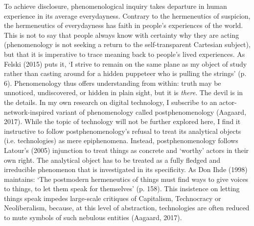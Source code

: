 \begin{adjmulticols}{2}{0mm}{0mm}
To achieve disclosure, phenomenological inquiry takes departure in human experience in its average everydayness. Contrary to the hermeneutics of suspicion, the hermeneutics of everydayness has faith in people’s experiences of the world. This is not to say that people always know with certainty why they are acting (phenomenology is not seeking a return to the self-transparent Cartesian subject), but that it is imperative to trace meaning back to people’s lived experiences. As Felski (2015) puts it, ‘I strive to remain on the same plane as my object of study rather than casting around for a hidden puppeteer who is pulling the strings’ (p. 6). Phenomenology thus offers understanding from within: truth may be unnoticed, undiscovered, or hidden in plain sight, but it is \textit{there}. The devil is in the details. In my own research on digital technology, I subscribe to an actor-network-inspired variant of phenomenology called postphenomenology (Aagaard, 2017). While the topic of technology will not be further explored here, I find it instructive to follow postphenomenology’s refusal to treat its analytical objects (i.e. technologies) as mere epiphenomena. Instead, postphenomenology follows Latour’s (2005) injunction to treat things as concrete and ‘worthy’ actors in their own right. The analytical object has to be treated as a fully fledged and irreducible phenomenon that is investigated in its specificity. As Don Ihde (1998) maintains: ‘The postmodern hermeneutics of things must find ways to give voices to things, to let them speak for themselves’ (p. 158). This insistence on letting things speak impedes large-scale critiques of Capitalism, Technocracy or Neoliberalism, because, at this level of abstraction, technologies are often reduced to mute symbols of such nebulous entities (Aagaard, 2017). 


\end{adjmulticols}
